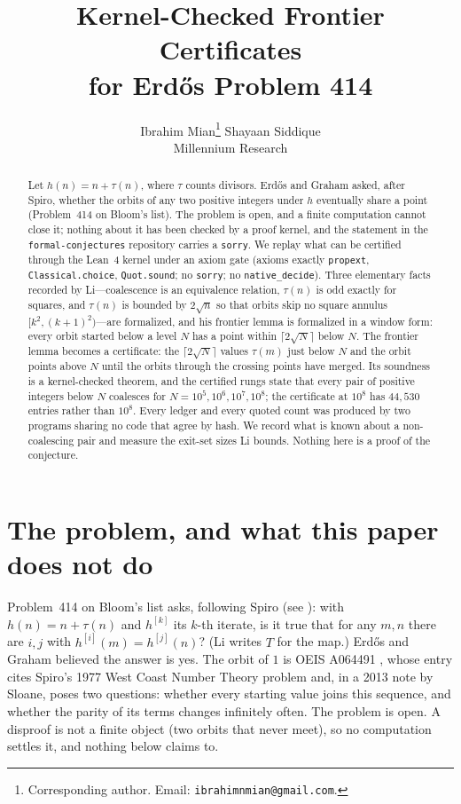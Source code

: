 \documentclass[11pt]{article}
\title{Kernel-Checked Frontier Certificates\\ for Erd\H{o}s Problem 414}
\author{Ibrahim Mian\thanks{Corresponding author. Email: \texttt{ibrahimnmian@gmail.com}.} \qquad Shayaan Siddique\\[2pt]
\normalsize Millennium Research}
\date{}
\theoremstyle{plain}
\theoremstyle{definition}
\begin{document}
\maketitle

\begin{abstract}
Let $h(n)=n+\tau(n)$, where $\tau$ counts divisors. Erd\H{o}s and Graham asked, after Spiro, whether the orbits of any two positive integers under $h$ eventually share a point (Problem~414 on Bloom's list). The problem is open, and a finite computation cannot close it; nothing about it has been checked by a proof kernel, and the statement in the \texttt{formal-conjectures} repository carries a \texttt{sorry}. We replay what can be certified through the Lean~4 kernel under an axiom gate (axioms exactly \texttt{propext}, \texttt{Classical.choice}, \texttt{Quot.sound}; no \texttt{sorry}; no \texttt{native\_decide}). Three elementary facts recorded by Li---coalescence is an equivalence relation, $\tau(n)$ is odd exactly for squares, and $\tau(n)$ is bounded by $2\sqrt n$ so that orbits skip no square annulus $[k^2,(k+1)^2)$---are formalized, and his frontier lemma is formalized in a window form: every orbit started below a level $N$ has a point within $\lceil 2\sqrt N\rceil$ below $N$. The frontier lemma becomes a certificate: the $\lceil 2\sqrt N\rceil$ values $\tau(m)$ just below $N$ and the orbit points above $N$ until the orbits through the crossing points have merged. Its soundness is a kernel-checked theorem, and the certified rungs state that every pair of positive integers below $N$ coalesces for $N=10^5,10^6,10^7,10^8$; the certificate at $10^8$ has $44{,}530$ entries rather than $10^8$. Every ledger and every quoted count was produced by two programs sharing no code that agree by hash. We record what is known about a non-coalescing pair and measure the exit-set sizes Li bounds. Nothing here is a proof of the conjecture.
\end{abstract}

\section{The problem, and what this paper does not do}
\label{sec:intro}

Problem~414 on Bloom's list \cite{EP414} asks, following Spiro (see \cite[p.~82]{ErGr80}): with $h(n)=n+\tau(n)$ and $h^{[k]}$ its $k$-th iterate, is it true that for any $m,n$ there are $i,j$ with $h^{[i]}(m)=h^{[j]}(n)$? (Li \cite{Li26} writes $T$ for the map.) Erd\H{o}s and Graham believed the answer is yes. The orbit of $1$ is OEIS A064491 \cite{OEIS}, whose entry cites Spiro's 1977 West Coast Number Theory problem and, in a 2013 note by Sloane, poses two questions: whether every starting value joins this sequence, and whether the parity of its terms changes infinitely often. The problem is open. A disproof is not a finite object (two orbits that never meet), so no computation settles it, and nothing below claims to.
\end{document}
